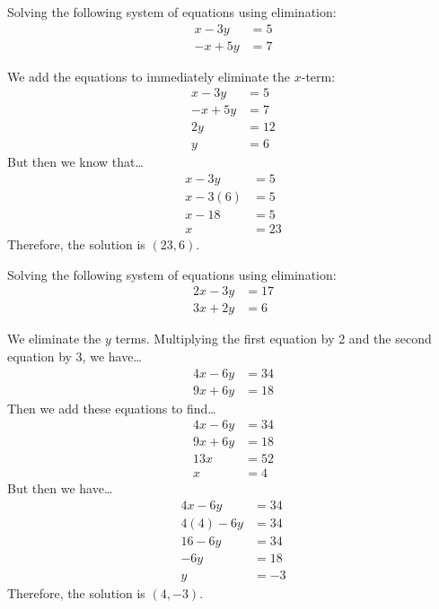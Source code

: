 \documentclass[11pt,letterpaper]{article}
\begin{document}
\newpage





 Solving the following system of equations using elimination: 
	\[
	\begin{aligned}
	x - 3y&= 5 \\ 
	-x + 5y&= 7
	\end{aligned}
	\] \pspace

\sol We add the equations to immediately eliminate the $x$-term:
	\[
	\begin{aligned}
	x - 3y&= 5 \\ 
	-x + 5y&= 7 \\ \hline
	2y&= 12 \\
	y&= 6
	\end{aligned}
	\] 
But then we know that\dots
	\[
	\begin{aligned}
	x - 3y&= 5 \\[0.3cm]
	x - 3(6)&= 5 \\[0.3cm]
	x - 18&= 5 \\[0.3cm]
	x&= 23
	\end{aligned}
	\] 
Therefore, the solution is $(23, 6)$. 





\newpage





 Solving the following system of equations using elimination:  
	\[
	\begin{aligned}
	2x - 3y&= 17 \\
	3x + 2y&= 6
	\end{aligned}
	\] \pspace

\sol We eliminate the $y$ terms. Multiplying the first equation by 2 and the second equation by 3, we have\dots
	\[
	\begin{aligned}
	4x - 6y&= 34 \\
	9x + 6y&= 18
	\end{aligned}
	\] 
Then we add these equations to find\dots
	\[
	\begin{aligned}
	4x - 6y&= 34 \\
	9x + 6y&= 18 \\ \hline
	13x&= 52 \\
	x&= 4
	\end{aligned}
	\] 
But then we have\dots
	\[
	\begin{aligned}
	4x - 6y&= 34 \\[0.3cm]
	4(4) - 6y&= 34 \\[0.3cm]
	16 - 6y&= 34 \\[0.3cm]
	-6y&= 18 \\[0.3cm]
	y&= -3
	\end{aligned}
	\] 
Therefore, the solution is $(4, -3)$. 


\end{document}
